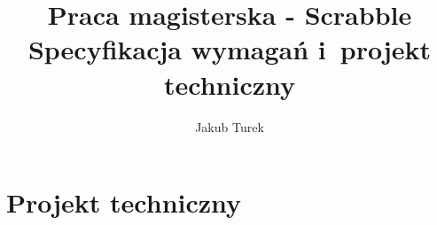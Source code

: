 \documentclass[a4paper,10pt]{report}
\title{Praca magisterska - Scrabble \\ \vspace{2mm} {\normalsize Specyfikacja wymagań i~projekt techniczny}}
\author{Jakub Turek}
\date{}
\begin{document}
\maketitle

\chapter{Projekt techniczny}
\end{document}
